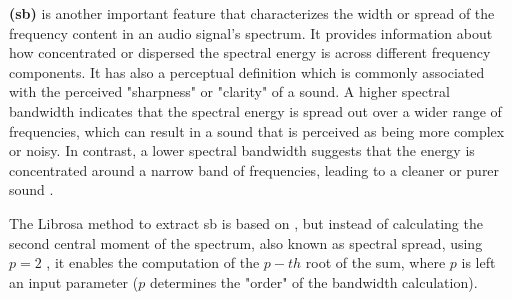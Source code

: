 


\textbf{ (\gls{sb})} is another important feature that characterizes the width or spread of the frequency content in an audio signal's spectrum. It provides information about how concentrated or dispersed the spectral energy is across different frequency components. It has also a perceptual definition which is commonly associated with the perceived "sharpness" or "clarity" of a sound. A higher spectral bandwidth indicates that the spectral energy is spread out over a wider range of frequencies, which can result in a sound that is perceived as being more complex or noisy. In contrast, a lower spectral bandwidth suggests that the energy is concentrated around a narrow band of frequencies, leading to a cleaner or purer sound \cite{Park2008}.


The Librosa \cite{McFee2015librosa_sw} method to extract \gls{sb} is based on \textcite{Klapuri2006}, but instead of calculating the second central moment of the spectrum, also known as spectral spread, using $p=2$ %
, it enables the computation of the $p-th$ root of the sum, where $p$ is left an input parameter ($p$ determines the "order" of the bandwidth calculation). 


